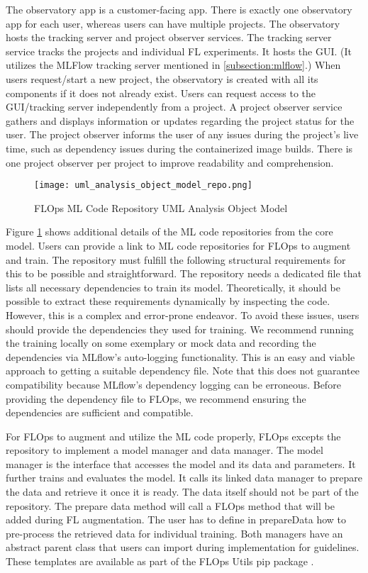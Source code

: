 The observatory app is a customer-facing app.
There is exactly one observatory app for each user, whereas users can have multiple projects.
The observatory hosts the tracking server and project observer services.
The tracking server service tracks the projects and individual FL experiments.
It hosts the GUI. 
(It utilizes the MLFlow tracking server mentioned in \ref{subsection:mlflow}.)
When users request/start a new project, the observatory is created with all its components if it does not already exist.
Users can request access to the GUI/tracking server independently from a project.
A project observer service gathers and displays information or updates regarding the project status for the user.
The project observer informs the user of any issues during the project's live time, such as dependency issues during the containerized image builds.
There is one project observer per project to improve readability and comprehension.

\begin{figure}[h]
    \centering
    \texttt{[image: uml\_analysis\_object\_model\_repo.png]}
    \caption{FLOps ML Code Repository UML Analysis Object Model}
    \label{fig:uml_repo_analysis_object_model}
\end{figure}

Figure \ref{fig:uml_repo_analysis_object_model} shows additional details of the ML code repositories from the core model.
Users can provide a link to ML code repositories for FLOps to augment and train.
The repository must fulfill the following structural requirements for this to be possible and straightforward.
The repository needs a dedicated file that lists all necessary dependencies to train its model.
Theoretically, it should be possible to extract these requirements dynamically by inspecting the code.
However, this is a complex and error-prone endeavor.
To avoid these issues, users should provide the dependencies they used for training.
We recommend running the training locally on some exemplary or mock data and recording the dependencies via MLflow's auto-logging functionality.
This is an easy and viable approach to getting a suitable dependency file.
Note that this does not guarantee compatibility because MLflow's dependency logging can be erroneous.
Before providing the dependency file to FLOps, we recommend ensuring the dependencies are sufficient and compatible.

For FLOps to augment and utilize the ML code properly, FLOps excepts the repository to implement a model manager and data manager.
The model manager is the interface that accesses the model and its data and parameters.
It further trains and evaluates the model.
It calls its linked data manager to prepare the data and retrieve it once it is ready.
The data itself should not be part of the repository.
The prepare data method will call a FLOps method that will be added during FL augmentation.
The user has to define in prepareData how to pre-process the retrieved data for individual training.
Both managers have an abstract parent class that users can import during implementation for guidelines.
These templates are available as part of the FLOps Utils pip package \cite{flops_utils_pip}.

